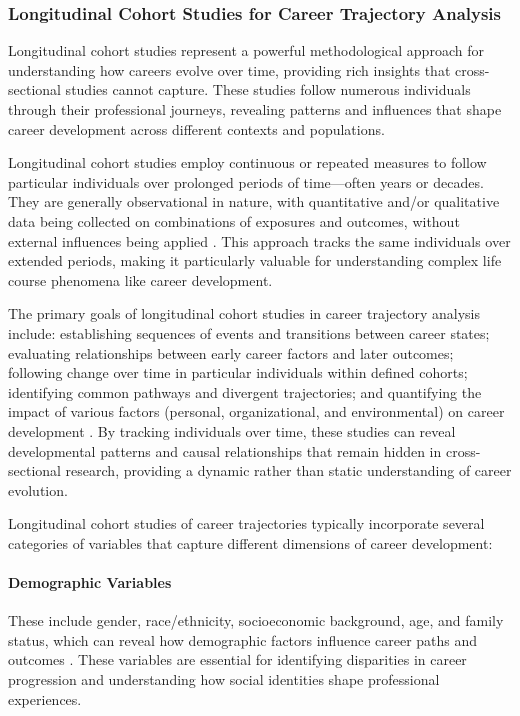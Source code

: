 \documentclass[../main.tex]{subfiles}
\begin{document}
\subsubsection{Longitudinal Cohort Studies for Career Trajectory Analysis}

Longitudinal cohort studies represent a powerful methodological approach for understanding how careers evolve over time, providing rich insights that cross-sectional studies cannot capture. These studies follow numerous individuals through their professional journeys, revealing patterns and influences that shape career development across different contexts and populations.


Longitudinal cohort studies employ continuous or repeated measures to follow particular individuals over prolonged periods of time—often years or decades. They are generally observational in nature, with quantitative and/or qualitative data being collected on combinations of exposures and outcomes, without external influences being applied \cite{caruana2015longitudinal}. This approach tracks the same individuals over extended periods, making it particularly valuable for understanding complex life course phenomena like career development.

The primary goals of longitudinal cohort studies in career trajectory analysis include: establishing sequences of events and transitions between career states; evaluating relationships between early career factors and later outcomes; following change over time in particular individuals within defined cohorts; identifying common pathways and divergent trajectories; and quantifying the impact of various factors (personal, organizational, and environmental) on career development \cite{caruana2015longitudinal, porfeli2011career}. By tracking individuals over time, these studies can reveal developmental patterns and causal relationships that remain hidden in cross-sectional research, providing a dynamic rather than static understanding of career evolution.


Longitudinal cohort studies of career trajectories typically incorporate several categories of variables that capture different dimensions of career development:

\paragraph{Demographic Variables}
These include gender, race/ethnicity, socioeconomic background, age, and family status, which can reveal how demographic factors influence career paths and outcomes \cite{dol2021pathways, rios2021career}. These variables are essential for identifying disparities in career progression and understanding how social identities shape professional experiences.
\end{document}
